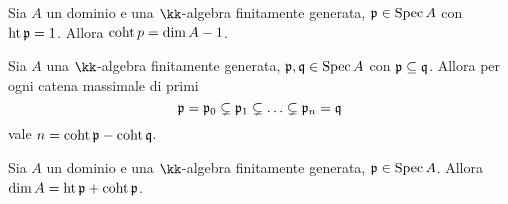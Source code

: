 \begin{lemma}
Sia $A$ un dominio e una $\kk$-algebra finitamente generata, $\pp\in\Spec A$ con $\height\pp=1$. Allora $\coht p=\dim A-1$.
\end{lemma}
\begin{proposition}
Sia $A$ una $\kk$-algebra finitamente generata, $\pp,\qq\in\Spec A$ con $\pp\subs\qq$. Allora per ogni catena massimale di primi
$$
\pp=\pp_0\subsn\pp_1\subsn\ldots\subsn\pp_n=\qq
$$
vale $n=\coht\pp-\coht\qq$.
\end{proposition}
\begin{corollary}
Sia $A$ un dominio e una $\kk$-algebra finitamente generata, $\pp\in\Spec A$. Allora $\dim A=\height\pp+\coht\pp$.
\end{corollary}




